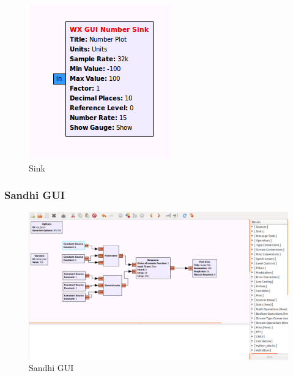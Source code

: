 \documentclass{beamer}
\begin{document}
\begin{frame}
\begin{figure}
	\begin{minipage}{.3\textwidth}
            \centering
            \includegraphics[width=.9\linewidth]{sink_block.png}
            \caption{Sink}
        \end{minipage}
    \end{figure}

\end{frame}

\begin{frame}
	\frametitle{Sandhi GUI}
	\begin{figure}
	\centering
	\includegraphics[width=.9\linewidth]{sandhi_GUI.png}
	\caption{Sandhi GUI}
	\end{figure}
\end{frame}
\end{document}
